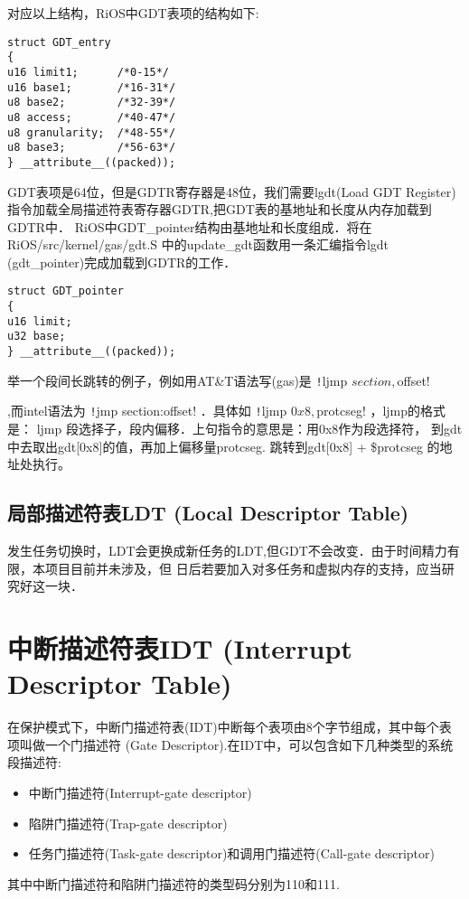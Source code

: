 对应以上结构，RiOS中GDT表项的结构如下:
\begin{verbatim}
struct GDT_entry 
{
u16 limit1;      /*0-15*/		
u16 base1;       /*16-31*/
u8 base2;        /*32-39*/
u8 access;       /*40-47*/
u8 granularity;  /*48-55*/
u8 base3;        /*56-63*/
} __attribute__((packed));  
\end{verbatim}    
GDT表项是64位，但是GDTR寄存器是48位，我们需要lgdt(Load GDT Register)
指令加载全局描述符表寄存器GDTR,把GDT表的基地址和长度从内存加载到GDTR中．
RiOS中GDT\_pointer结构由基地址和长度组成．将在RiOS/src/kernel/gas/gdt.S
中的update\_gdt函数用一条汇编指令lgdt (gdt\_pointer)完成加载到GDTR的工作．
\begin{verbatim}
struct GDT_pointer
{
u16 limit;
u32 base;
} __attribute__((packed));
\end{verbatim}  

举一个段间长跳转的例子，例如用AT\&T语法写(gas)是
\texttt!ljmp $section, $offset!

,而intel语法为
\texttt!jmp section:offset!
．具体如
\texttt!ljmp $0x8, $protcseg!
，ljmp的格式是： ljmp 段选择子，段内偏移．上句指令的意思是：用0x8作为段选择符，
到gdt中去取出gdt[0x8]的值，再加上偏移量protcseg. 跳转到gdt[0x8] + \$protcseg
的地址处执行。　
\subsection{局部描述符表LDT (Local Descriptor Table)}
发生任务切换时，LDT会更换成新任务的LDT,但GDT不会改变．由于时间精力有限，本项目目前并未涉及，但
日后若要加入对多任务和虚拟内存的支持，应当研究好这一块．
\section{中断描述符表IDT (Interrupt Descriptor Table)}
在保护模式下，中断门描述符表(IDT)中断每个表项由8个字节组成，其中每个表项叫做一个门描述符
(Gate Descriptor).在IDT中，可以包含如下几种类型的系统段描述符:
\begin{itemize}
    \item 中断门描述符(Interrupt-gate descriptor)
    \item 陷阱门描述符(Trap-gate descriptor)
    \item 任务门描述符(Task-gate descriptor)和调用门描述符(Call-gate descriptor)
\end{itemize}
其中中断门描述符和陷阱门描述符的类型码分别为110和111.

